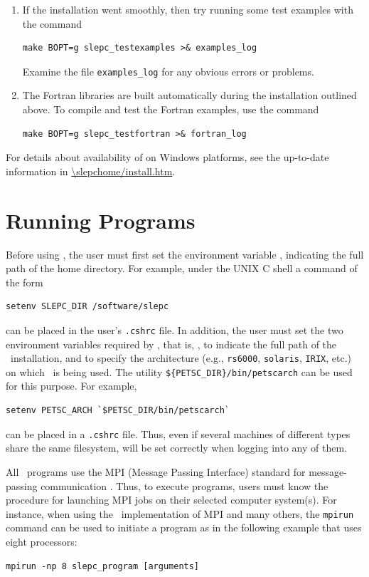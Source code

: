 \begin{enumerate}
	\item If the installation went smoothly, then try running some test examples with the command
	\begin{Verbatim}[fontsize=\small]
	make BOPT=g slepc_testexamples >& examples_log 
	\end{Verbatim}
     Examine the file \Verb!examples_log! for any obvious errors or problems.
	\item The Fortran libraries are built automatically during the installation outlined above. To compile and test the Fortran examples, use the command
	\begin{Verbatim}[fontsize=\small]
	make BOPT=g slepc_testfortran >& fortran_log
	\end{Verbatim}
\end{enumerate}
	
	For details about availability of \slepc on Windows platforms, see the up-to-date information in \url{\slepchome/install.htm}.
\section{Running \slepc Programs}

Before using \slepc, the user must first set the environment variable
, indicating the full path of the \slepc home
directory. For example, under the UNIX C shell a command of the form
	\begin{Verbatim}[fontsize=\small]
	setenv SLEPC_DIR /software/slepc
	\end{Verbatim}
can be placed in the user's \Verb!.cshrc! file. 
In addition, the user must set the two environment
variables required by \petsc, that is, , to indicate the full path of the \petsc\ installation, and  to specify the architecture (e.g., \texttt{rs6000},
\texttt{solaris}, \texttt{IRIX}, etc.)  on which \petsc\ is being used.  The utility
 \Verb!${PETSC_DIR}/bin/petscarch! can be used for this purpose.  For example,
	\begin{Verbatim}[fontsize=\small]
	setenv PETSC_ARCH `$PETSC_DIR/bin/petscarch`
	\end{Verbatim}
can be placed in a \Verb!.cshrc! file.  Thus, even if several machines of different
types share the same filesystem,  will be set correctly
when logging into any of them. 

All \petsc\ programs use the MPI (Message Passing Interface) standard
for message-passing communication \citep{MPI-Forum:1994:MMI}.  Thus, to execute
\slepc programs, users must know the procedure for launching MPI jobs
on their selected computer system(s).  For instance, when using the
\mpich\ implementation of MPI and many others, the \texttt{mpirun} command can be used to initiate a program as in the following example that uses eight processors:
	\begin{Verbatim}[fontsize=\small]
	mpirun -np 8 slepc_program [arguments]
	\end{Verbatim}

